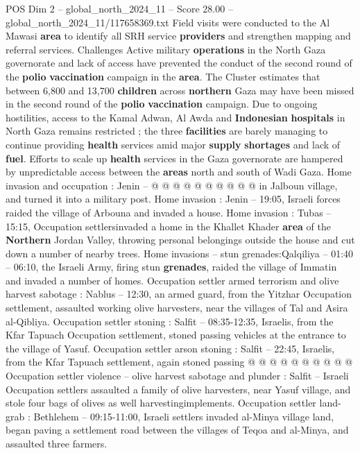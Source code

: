 \begin{textsample}{POS Dim 2 – global\_north\_2024\_11 – Score 28.00 – global\_north\_2024\_11/117658369.txt}
Field visits were conducted to the Al Mawasi \textbf{area} to identify all SRH service \textbf{providers} and strengthen mapping and referral services.
Challenges Active military \textbf{operations} in the North Gaza governorate and lack of access have prevented the conduct of the second round of the \textbf{polio} \textbf{vaccination} campaign in the \textbf{area}.
The Cluster estimates that between 6,800 and 13,700 \textbf{children} across \textbf{northern} Gaza may have been missed in the second round of the \textbf{polio} \textbf{vaccination} campaign.
Due to ongoing hostilities, access to the Kamal Adwan, Al Awda and \textbf{Indonesian} \textbf{hospitals} in North Gaza remains restricted ; the three \textbf{facilities} are barely managing to continue providing \textbf{health} services amid major \textbf{supply} \textbf{shortages} and lack of \textbf{fuel}.
Efforts to scale up \textbf{health} services in the Gaza governorate are hampered by unpredictable access between the \textbf{areas} north and south of Wadi Gaza.
Home invasion and occupation : Jenin -- @ @ @ @ @ @ @ @ @ @ in Jalboun village, and turned it into a military post.
Home invasion : Jenin -- 19:05, Israeli forces raided the village of Arbouna and invaded a house.
Home invasion : Tubas -- 15:15, Occupation settlersinvaded a home in the Khallet Khader \textbf{area} of the \textbf{Northern} Jordan Valley, throwing personal belongings outside the house and cut down a number of nearby trees.
Home invasions -- stun grenades:Qalqiliya -- 01:40 -- 06:10, the Israeli Army, firing stun \textbf{grenades}, raided the village of Immatin and invaded a number of homes.
Occupation settler armed terrorism and olive harvest sabotage : Nablus -- 12:30, an armed guard, from the Yitzhar Occupation settlement, assaulted working olive harvesters, near the villages of Tal and Asira al-Qibliya.
Occupation settler stoning : Salfit -- 08:35-12:35, Israelis, from the Kfar Tapuach Occupation settlement, stoned passing vehicles at the entrance to the village of Yasuf.
Occupation settler arson stoning : Salfit -- 22:45, Israelis, from the Kfar Tapuach settlement, again stoned passing @ @ @ @ @ @ @ @ @ @ Occupation settler violence -- olive harvest sabotage and plunder : Salfit -- Israeli Occupation settlers assaulted a family of olive harvesters, near Yasuf village, and stole four bags of olives as well harvestingimplements.
Occupation settler land-grab : Bethlehem -- 09:15-11:00, Israeli settlers invaded al-Minya village land, began paving a settlement road between the villages of Teqoa and al-Minya, and assaulted three farmers.

\end{textsample}
